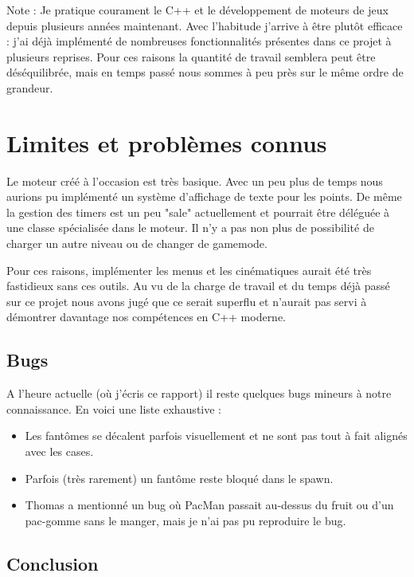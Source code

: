 \documentclass [twoside,a4paper,11pt,french] {report}
\begin{document}
    Note : Je pratique courament le C++ et le développement de moteurs de jeux depuis plusieurs années maintenant.
    Avec l'habitude j'arrive à être plutôt efficace : j'ai déjà implémenté de nombreuses fonctionnalités
    présentes dans ce projet à plusieurs reprises. Pour ces raisons la quantité de travail semblera peut être déséquilibrée, mais en 
    temps passé nous sommes à peu près sur le même ordre de grandeur.


\chapter{Limites et problèmes connus}

    Le moteur créé à l'occasion est très basique. Avec un peu plus de temps nous aurions pu implémenté un système d'affichage
    de texte pour les points. De même la gestion des timers est un peu "sale" actuellement et pourrait être déléguée à une 
    classe spécialisée dans le moteur.
    Il n'y a pas non plus de possibilité de charger un autre niveau ou de changer de gamemode.
    
    Pour ces raisons, implémenter les menus et les cinématiques aurait été très fastidieux sans ces outils.
    Au vu de la charge de travail et du temps déjà passé sur ce projet nous avons jugé que ce serait superflu et
    n'aurait pas servi à démontrer davantage nos compétences en C++ moderne.

\section{Bugs}
    A l'heure actuelle (où j'écris ce rapport) il reste quelques bugs mineurs à notre connaissance. En voici une liste exhaustive :

    \begin{itemize}
         \item Les fantômes se décalent parfois visuellement et ne sont pas tout à fait alignés avec les cases.
         \item Parfois (très rarement) un fantôme reste bloqué dans le spawn.
         \item Thomas a mentionné un bug où PacMan passait au-dessus du fruit ou d'un pac-gomme sans le manger, mais je n'ai pas pu reproduire le bug.
    \end{itemize}
\section{Conclusion}
\end{document}
